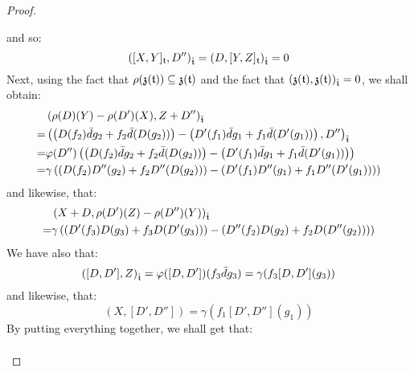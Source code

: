\begin{proof}
\begin{enumerate}
                    and so:
                        $$([X, Y]_{\toroidal}, D'')_{\extendedtoroidal} = (D, [Y, Z]_{\toroidal})_{\extendedtoroidal} = 0$$
                    Next, using the fact that $\rho(\z(\toroidal)) \subseteq \z(\toroidal)$ and the fact that $(\z(\toroidal), \z(\toroidal))_{\extendedtoroidal} = 0$, we shall obtain:
                        $$
                            \begin{aligned}
                                & \left(\rho(D)(Y) - \rho(D')(X), Z + D'' \right)_{\extendedtoroidal}
                                \\
                                = & \left( \left( D(f_2) \bar{d}g_2 + f_2 \bar{d}( D(g_2) ) \right) - \left( D'(f_1) \bar{d}g_1 + f_1 \bar{d}( D'(g_1) ) \right), D'' \right)_{\extendedtoroidal}
                                \\
                                = & \varphi(D'')\left( \left( D(f_2) \bar{d}g_2 + f_2 \bar{d}( D(g_2) ) \right) - \left( D'(f_1) \bar{d}g_1 + f_1 \bar{d}( D'(g_1) ) \right) \right)
                                \\
                                = & \gamma\left(
                                    \left( D(f_2) D''(g_2) + f_2 D''( D(g_2) ) \right) - \left( D'(f_1) D''(g_1) + f_1 D''( D'(g_1) ) \right)
                                \right)
                            \end{aligned}
                        $$
                    and likewise, that:
                        $$
                            \begin{aligned}
                                & \left( X + D, \rho(D')(Z) - \rho(D'')(Y) \right)_{\extendedtoroidal}
                                \\
                                = & \gamma\left(
                                \left( D'(f_3) D(g_3) + f_3 D( D'(g_3) ) \right) - \left( D''(f_2) D(g_2) + f_2 D( D''(g_2) ) \right)
                        \right)
                            \end{aligned}
                        $$
                    We have also that:
                        $$\left( [D, D'], Z \right)_{\extendedtoroidal} = \varphi([D, D'])( f_3 \bar{d} g_3 ) = \gamma(f_3 [D, D'](g_3))$$
                    and likewise, that:
                        $$\left(X, [D', D'']\right) = \gamma(f_1 [D', D''](g_1))$$
                    By putting everything together, we shall get that:
                        $$
                            \begin{aligned}

\end{aligned}$$
\end{enumerate}
\end{proof}
